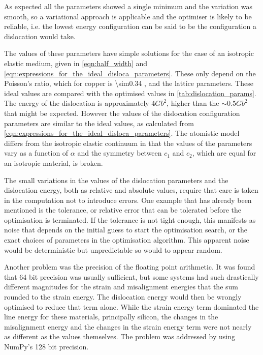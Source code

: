 As expected all the parameters showed a single minimum and the variation was smooth, so a variational approach is applicable and the optimiser is likely to be reliable, i.e. the lowest energy configuration can be said to be the configuration a dislocation would take. 






The values of these parameters have simple solutions for the case of an isotropic elastic medium, given in \autoref{eqn:half_width} and \autoref{eqn:expressions_for_the_ideal_disloca_parameters}. These only depend on the Poisson's ratio, which for copper is \num{\sim0.34} \cite{Koster1961}, and the lattice parameters. These ideal values are compared with the optimised values in \autoref{tab:dislocation_params}. The energy of the dislocation is approximately $4Gb^2$, higher than the $\sim0.5 G b^2$ that might be expected. However the values of the dislocation configuration parameters are similar to the ideal values, as calculated from \autoref{eqn:expressions_for_the_ideal_disloca_parameters}. The atomistic model differs from the isotropic elastic continuum in that the values of the parameters vary as a function of $\alpha$ and the symmetry between $c_1$ and $c_2$, which are equal for an isotropic material, is broken.

The small variations in the values of the dislocation parameters and the dislocation energy, both as relative and absolute values, require that care is taken in the computation not to introduce errors. One example that has already been mentioned is the tolerance, or relative error that can be tolerated before the optimisation is terminated. If the tolerance is not tight enough,  this manifests as noise that depends on the initial guess to start the optimisation search, or the exact choices of parameters in the optimisation algorithm. This apparent noise would be deterministic but unpredictable so would to appear random. 

Another problem was the precision of the floating point arithmetic. It was found that \num{64} bit precision was usually sufficient, but some systems had such drastically different magnitudes for the strain and misalignment energies that the sum rounded to the strain energy. The dislocation energy would then be wrongly optimised to reduce that term alone. While the strain energy term dominated the line energy for these materials, principally silicon, the changes in the misalignment energy and the changes in the strain energy term were not nearly as different as the values themselves. The problem was addressed by using NumPy's \num{128} bit precision.  





